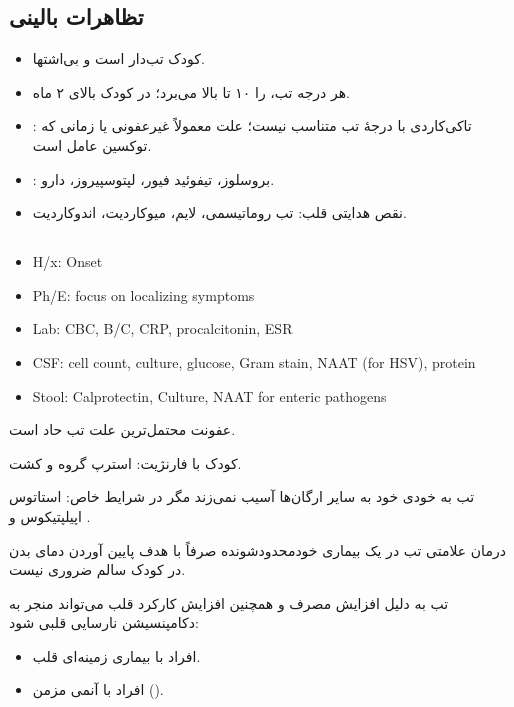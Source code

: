\documentclass[12pt,a4paper]{article}
\begin{document}
\subsection*{تظاهرات بالینی}
\begin{itemize}
\item کودک تب‌دار  است و بی‌اشتها.
\item هر درجه تب،  را ۱۰ تا بالا می‌برد؛ در کودک بالای ۲ ماه.
\item {}: تاکی‌کاردی با درجهٔ تب متناسب نیست؛ علت معمولاً غیرعفونی یا زمانی که توکسین عامل است.
\item {}: بروسلوز، تیفوئید فیور، لپتوسپیروز، دارو.
\item نقص هدایتی قلب: تب روماتیسمی، لایم، میوکاردیت، اندوکاردیت.
\end{itemize}

\subsection*{}
\begin{latin}
\begin{itemize}
\item H/x: Onset
\item Ph/E: focus on localizing symptoms
\item Lab: CBC, B/C, CRP, procalcitonin, ESR
\item CSF: cell count, culture, glucose, Gram stain, NAAT (for HSV), protein
\item Stool: Calprotectin, Culture, NAAT for enteric pathogens
\end{itemize}
\end{latin}

عفونت محتمل‌ترین علت تب حاد است.

کودک با فارنژیت:  استرپ گروه  و کشت.

تب به خودی خود به سایر ارگان‌ها آسیب نمی‌زند مگر در شرایط خاص:
استاتوس اپیلپتیکوس و .

درمان علامتی تب در یک بیماری خودمحدودشونده صرفاً با هدف پایین آوردن دمای بدن در کودک سالم ضروری نیست.

تب به دلیل افزایش مصرف  و همچنین افزایش کارکرد قلب می‌تواند منجر به دکامپنسیشن نارسایی قلبی شود:
\begin{itemize}
\item افراد با بیماری زمینه‌ای قلب.
\item افراد با آنمی مزمن ().
\end{itemize}
\end{document}
